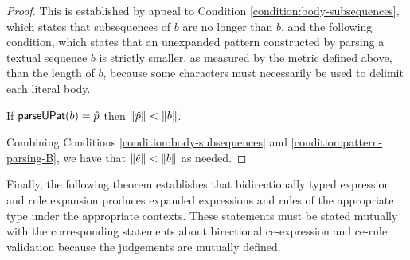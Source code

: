 \begin{proof}
This is established by appeal to Condition \ref{condition:body-subsequences}, which states that subsequences of $b$ are no longer than $b$, and the following condition, which states that an unexpanded pattern constructed by parsing a textual sequence $b$ is strictly smaller, as measured by the metric defined above, than the length of $b$, because some characters must necessarily be used to delimit each literal body.
\begin{condition}\label{condition:pattern-parsing-B} If $\mathsf{parseUPat}(b)=\hat{p}$ then $\Vert \hat{p} \Vert < \Vert b \Vert$.\end{condition}

Combining Conditions \ref{condition:body-subsequences} and \ref{condition:pattern-parsing-B}, we have that $\Vert {\hat e} \Vert < \Vert b \Vert$ as needed.
\end{proof}

Finally, the following theorem establishes that bidirectionally typed expression and rule expansion produces expanded expressions and rules of the appropriate type under the appropriate contexts. These statements must be stated mutually with the corresponding statements about birectional ce-expression and ce-rule validation because the judgements are mutually defined. 

